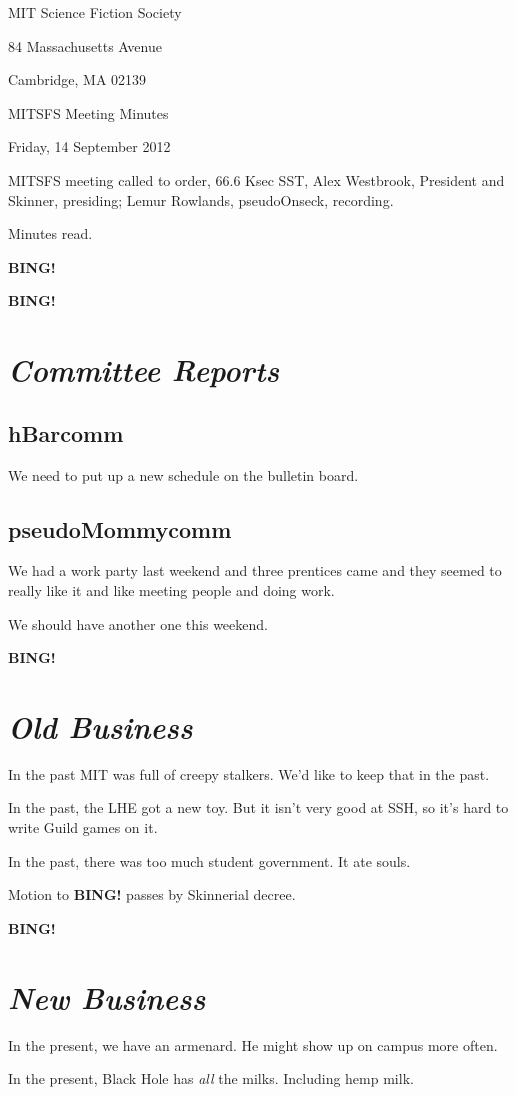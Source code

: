 \documentclass[10pt]{article}
\newcommand{\bing}{{\bf BING!} }
\newcommand{\goto}[1]{\bing \vskip 12pt \section*{{\em{#1}}}}
\newcommand{\skinner}{Alex Westbrook, President and Skinner}
\newcommand{\onseck}{Lemur Rowlands, pseudoOnseck}
\newcommand{\meetingdate}{Friday, 14 September 2012}
\begin{document}
\begin{center}

MIT Science Fiction Society

84 Massachusetts Avenue

Cambridge, MA 02139

\vspace{12pt}

MITSFS Meeting Minutes

\meetingdate

\end{center}

\vspace{18pt}

\setlength{\parskip}{6pt}

\noindent
MITSFS meeting called to order, 66.6 Ksec SST,
\skinner, presiding; \onseck, recording.

Minutes read.

\bing

\goto{Committee Reports}

\subsection*{hBarcomm}

We need to put up a new schedule on the bulletin board.

\subsection*{pseudoMommycomm}

We had a work party last weekend and three prentices came
and they seemed to really like it and like meeting people 
and doing work.

We should have another one this weekend.


\goto{Old Business}

In the past MIT was full of creepy stalkers.  We'd like to
keep that in the past.

In the past, the LHE got a new toy.  But it isn't very good
at SSH, so it's hard to write Guild games on it.

In the past, there was too much student government.  It ate souls.

Motion to \bing passes by Skinnerial decree.


\goto{New Business}

In the present, we have an armenard.  He might show up on campus more often.

In the present, Black Hole has \emph{all} the milks.  Including hemp
milk.
\end{document}
